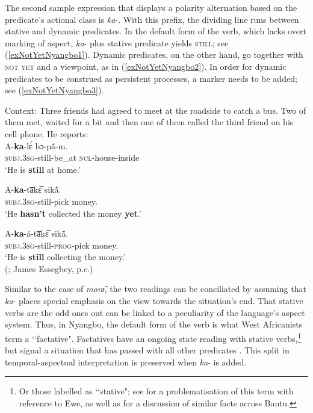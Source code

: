 The second sample expression that displays a polarity alternation based on the predicate's actional class is  \mbox{\textit{ka}-}. With this prefix, the dividing line runs between stative and dynamic predicates. In the default form of the verb, which lacks overt marking of aspect, \mbox{\textit{ka}-} plus stative predicate yields \textsc{still}; see (\ref{exNotYetNyangbo1}). Dynamic predicates, on the other hand, go together with \textsc{not yet} and a  viewpoint, as in (\ref{exNotYetNyangbo2}). In order for dynamic predicates to be construed as persistent processes, a  marker needs to be added; see (\ref{exNotYetNyangbo3}).

\begin{exe}
	\ex
	\begin{xlist}
		\exi{}
		\ex\label{exNotYetNyangbo1}
		Context: Three friends had agreed to meet at the roadside to catch a bus. Two of them met, waited for a bit and then one of them called the third friend on his cell phone. He reports:\\
		\gll A-\textbf{ka}-lɛ́ bɔ-pã́-m.\\
		\textsc{subj}.3\textsc{sg}-still-be\_at \textsc{ncl}-house-inside\\
		\glt \lq He is \textbf{still} at home.’

		\ex\label{exNotYetNyangbo2}
		\gll A-\textbf{ka}-ta̅kɛ̅ sikã́.\\
		\textsc{subj}.3\textsc{sg}-still-pick money.\\
		\glt \lq He \textbf{hasn’t} collected the money \textbf{yet}.'

		\ex\label{exNotYetNyangbo3}
		\gll A-\textbf{ka}-á-ta̅kɛ̅ sikã́.\\
		\textsc{subj}.3\textsc{sg}-still-\textsc{prog}-pick money.\\
		\glt \lq He is \textbf{still} collecting the money.' 
		\\(\cite[46]{Essegbey2012}; James Essegbey, p.c.)
	\end{xlist}
\end{exe}

Similar to the case of  \textit{morә̃}, the two readings can be conciliated by assuming that \mbox{\textit{ka}-} places special emphasis on the  view towards the situation's end. That stative verbs are the odd ones out can be linked to a peculiarity of the language's aspect system. Thus, in Nyangbo, the default form of the verb is what West Africanists term a \lq\lq factative". Factatives have an ongoing state reading with stative verbs,\footnote{Or those labelled as \lq\lq stative"; see \textcite[140]{Ameka2008} for a problematisation of this term with reference to Ewe, as well as \textcite{CranePersohn2019} for a discussion of similar facts across Bantu.} but signal a situation that has passed with all other predicates \parencite[346–347]{Welmers1973}. This split in temporal-aspectual interpretation is preserved when \mbox{\textit{ka}-} is added.

